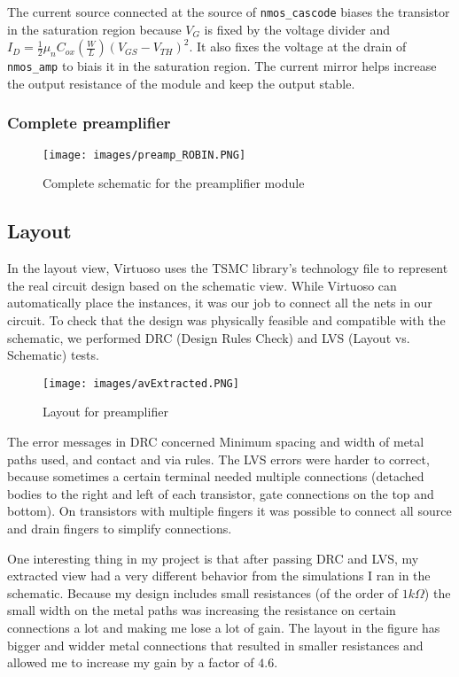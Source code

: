 \documentclass[a4paper,12pt,twoside]{article}
\begin{document}
	The current source connected at the source of \texttt{nmos\_cascode}  biases the transistor in the saturation region because $V_G$ is fixed by the voltage divider and $I_D = \frac{1}{2} \mu_n C_{ox} \left( \frac{W}{L} \right) (V_{GS} - V_{TH})^2$. It also fixes the voltage at the drain of \texttt{nmos\_amp} to biais it in the saturation region. The current mirror helps increase the output resistance of the module and keep the output stable.
	
	\subsubsection{Complete preamplifier}
	
	\begin{figure}[h!]
		\centering
		\texttt{[image: images/preamp\_ROBIN.PNG]}
		\label{preamp_robin}
		\caption{Complete schematic for the preamplifier module}
	\end{figure}
	
	\subsection{Layout}
	
	In the layout view, Virtuoso uses the TSMC library's technology file to represent the real circuit design based on the schematic view. While Virtuoso can automatically place the instances, it was our job to connect all the nets in our circuit. To check that the design was physically feasible and compatible with the schematic, we performed DRC (Design Rules Check) and LVS (Layout vs. Schematic) tests.
	
	\begin{figure}[h!]
		\centering
		\texttt{[image: images/avExtracted.PNG]}
		\label{avExtracted}
		\caption{Layout for preamplifier}
	\end{figure}
	
	The error messages in DRC concerned Minimum spacing and width of metal paths used, and contact and via rules. The LVS errors were harder to correct, because sometimes a certain terminal needed multiple connections (detached bodies to the right and left of each transistor, gate connections on the top and bottom). On transistors with multiple fingers it was possible to connect all source and drain fingers to simplify connections.
	
	One interesting thing in my project is that after passing DRC and LVS, my extracted view had a very different behavior from the simulations I ran in the schematic. Because my design includes small resistances (of the order of $1k\Omega$) the small width on the metal paths was increasing the resistance on certain connections a lot and making me lose a lot of gain. The layout in the figure has bigger and widder metal connections that resulted in smaller resistances and allowed me to increase my gain by a factor of $4.6$.
	
\end{document}
